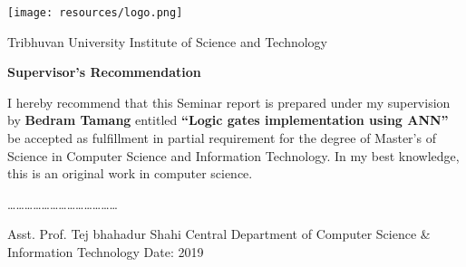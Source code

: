 \ifdefined\COMPLETE
\else
{}
\begin{center}
	\texttt{[image: resources/logo.png]}
\end{center}

\begin{center}
	Tribhuvan University
	\linebreak
	Institute of Science and Technology 
\end{center}


\begin{center}
	\vspace{2cm}
	\textbf{
		Supervisor’s Recommendation
	}
\end{center}

\vspace{2cm}
I hereby recommend that this Seminar report is prepared under my supervision by \textbf{Bedram Tamang} entitled \textbf{“Logic gates implementation using ANN”} be accepted as fulfillment in partial requirement for the degree of Master's of Science in Computer Science and Information Technology. In my best knowledge, this is an original work in computer science.

\vspace{3cm}
\begin{flushleft}
	…………………………………
	
	Asst. Prof. Tej bhahadur Shahi \newline
	Central Department of Computer Science  \newline
	\& Information Technology \newline
	Date: 2019
\end{flushleft}
\clearpage
\fi